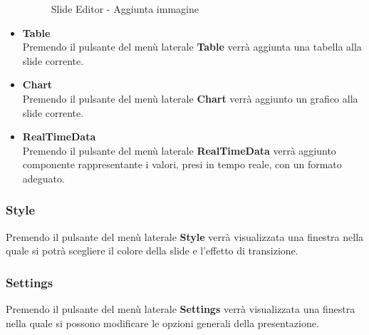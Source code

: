 \begin{itemize}
\begin{figure}[h]
	\caption{Slide Editor - Aggiunta immagine} 
    \end{figure}
 \item \textbf{Table}\\
    Premendo il pulsante del menù laterale \textbf{Table} verrà aggiunta una tabella alla \gls{slide} corrente.
 \item \textbf{Chart}\\
    Premendo il pulsante del menù laterale \textbf{Chart} verrà aggiunto un grafico alla \gls{slide} corrente.
 \item \textbf{RealTimeData}\\
    Premendo il pulsante del menù laterale \textbf{RealTimeData} verrà aggiunto componente rappresentante i valori, presi in tempo reale, con un formato adeguato.
\end{itemize}


\subsubsection{Style}
Premendo il pulsante del menù laterale \textbf{Style} verrà visualizzata una finestra nella quale si potrà scegliere il colore della \gls{slide} e l'effetto di transizione.
\subsubsection{Settings}
Premendo il pulsante del menù laterale \textbf{Settings} verrà visualizzata una finestra nella quale si possono modificare le opzioni generali della presentazione.

